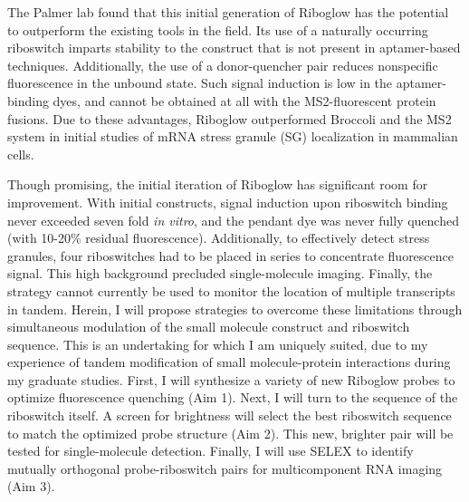 The Palmer lab found that this initial generation of Riboglow has the potential to outperform the existing tools in the field.
Its use of a naturally occurring riboswitch imparts stability to the construct that is not present in aptamer-based techniques\cite{PorterRecurrentRNAmotifs2017}.
Additionally, the use of a donor-quencher pair reduces nonspecific fluorescence in the unbound state. Such signal induction is low in the aptamer-binding dyes, and cannot be obtained at all with the MS2-fluorescent protein fusions. Due to these advantages, Riboglow outperformed Broccoli and the MS2 system in initial studies of mRNA stress granule (SG) localization in mammalian cells.

Though promising, the initial iteration of Riboglow has significant room for improvement. With initial constructs, signal induction upon riboswitch binding never exceeded seven fold \textit{in vitro}, and the pendant dye was never fully quenched (with 10-20\% residual fluorescence). Additionally, to effectively detect stress granules, four riboswitches had to be placed in series to concentrate fluorescence signal. This high background precluded single-molecule imaging. Finally, the strategy cannot currently be used to monitor the location of multiple transcripts in tandem. Herein, I will propose strategies to overcome these limitations through simultaneous modulation of the small molecule construct and riboswitch sequence. This is an undertaking for which I am uniquely suited, due to my experience of tandem modification of small molecule-protein interactions during my graduate studies. First, I will synthesize a variety of new Riboglow probes to optimize fluorescence quenching (Aim 1). Next, I will turn to the sequence of the riboswitch itself. A screen for brightness will select the best riboswitch sequence to match the optimized probe structure (Aim 2). This new, brighter pair will be tested for single-molecule detection. Finally, I will use SELEX to identify mutually orthogonal probe-riboswitch pairs for multicomponent RNA imaging (Aim 3).

